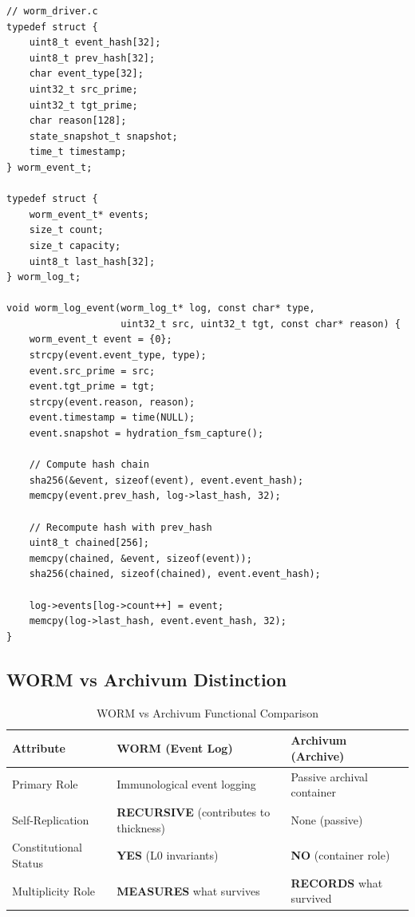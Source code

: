 \documentclass[11pt,a4paper]{article}
\begin{document}
\begin{lstlisting}[caption={WORM Driver Implementation}, label=lst:worm]
// worm_driver.c
typedef struct {
    uint8_t event_hash[32];
    uint8_t prev_hash[32];
    char event_type[32];
    uint32_t src_prime;
    uint32_t tgt_prime;
    char reason[128];
    state_snapshot_t snapshot;
    time_t timestamp;
} worm_event_t;

typedef struct {
    worm_event_t* events;
    size_t count;
    size_t capacity;
    uint8_t last_hash[32];
} worm_log_t;

void worm_log_event(worm_log_t* log, const char* type, 
                    uint32_t src, uint32_t tgt, const char* reason) {
    worm_event_t event = {0};
    strcpy(event.event_type, type);
    event.src_prime = src;
    event.tgt_prime = tgt;
    strcpy(event.reason, reason);
    event.timestamp = time(NULL);
    event.snapshot = hydration_fsm_capture();
    
    // Compute hash chain
    sha256(&event, sizeof(event), event.event_hash);
    memcpy(event.prev_hash, log->last_hash, 32);
    
    // Recompute hash with prev_hash
    uint8_t chained[256];
    memcpy(chained, &event, sizeof(event));
    sha256(chained, sizeof(chained), event.event_hash);
    
    log->events[log->count++] = event;
    memcpy(log->last_hash, event.event_hash, 32);
}
\end{lstlisting}

\subsection{WORM vs Archivum Distinction}

\begin{table}[h]
\centering
\caption{WORM vs Archivum Functional Comparison}
\label{tab:worm_archivum}
\begin{tabular}{@{}l l l@{}}
\toprule
\textbf{Attribute} & \textbf{WORM (Event Log)} & \textbf{Archivum (Archive)} \\
\midrule
Primary Role & Immunological event logging & Passive archival container \\
Self-Replication & \textbf{RECURSIVE} (contributes to thickness) & None (passive) \\
Constitutional Status & \textbf{YES} (L0 invariants) & \textbf{NO} (container role) \\
Multiplicity Role & \textbf{MEASURES} what survives & \textbf{RECORDS} what survived \\
\bottomrule
\end{tabular}
\end{table}
\end{document}
